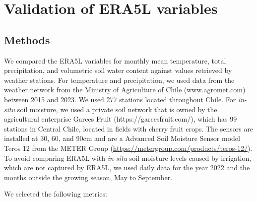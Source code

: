 \documentclass[
  authoryear,
  preprint,
  3p,
  onecolumn]{elsarticle}
\begin{document}
\begin{frontmatter}








        





\end{frontmatter}
    \renewcommand\thesection{S\arabic{section}}
\renewcommand\thefigure{S\arabic{figure}}
\renewcommand\thetable{S\arabic{table}}

\ifdefined\Shaded\renewenvironment{Shaded}{\begin{tcolorbox}[sharp corners, enhanced, interior hidden, boxrule=0pt, borderline west={3pt}{0pt}{shadecolor}, frame hidden, breakable]}{\end{tcolorbox}}\fi

\hypertarget{validation-of-era5l-variables}{%
\section{Validation of ERA5L
variables}\label{validation-of-era5l-variables}}

\hypertarget{methods}{%
\subsection{Methods}\label{methods}}

We compared the ERA5L \citep{MunozSabater2021} variables for monthly
mean temperature, total precipitation, and volumetric soil water content
against values retrieved by weather stations. For temperature and
precipitation, we used data from the weather network from the Ministry
of Agriculture of Chile (www.agromet.com) between 2015 and 2023. We used
277 stations located throughout Chile. For \emph{in-situ} soil moisture,
we used a private soil network that is owned by the agricultural
enterprise Garces Fruit (https://garcesfruit.com/), which has 99
stations in Central Chile, located in fields with cherry fruit crops.
The sensors are installed at 30, 60, and 90cm and are a Advanced Soil
Moisture Sensor model Teros 12 from the METER Group
(\url{https://metergroup.com/products/teros-12/}). To avoid comparing
ERA5L with \emph{in-situ} soil moisture levels caused by irrigation,
which are not captured by ERA5L, we used daily data for the year 2022
and the months outside the growing season, May to September.

We selected the following metrics:
\end{document}
